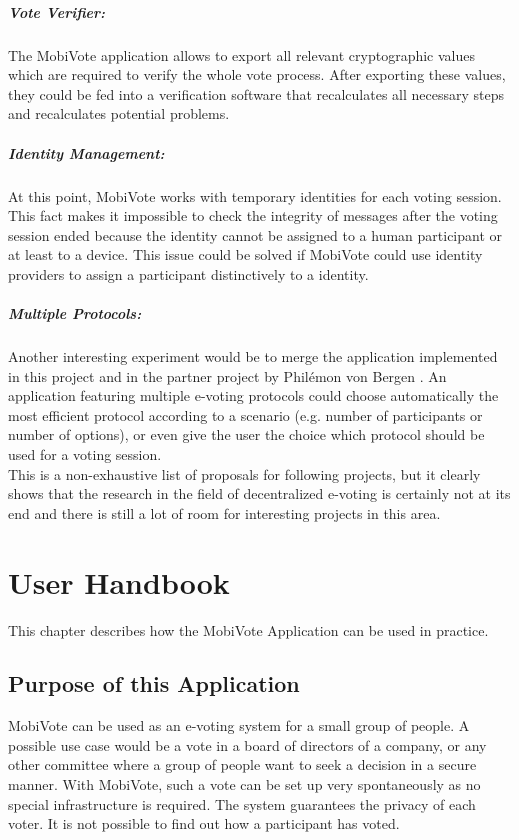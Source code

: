 \documentclass[numbers=noenddot, abstract=on, a4paper, headsepline,
footsepline, oneside, draft=off]{scrreprt}
\begin{document}
\paragraph{Vote Verifier:} The MobiVote application allows to export all
relevant cryptographic values which are required to verify the whole vote
process. After exporting these values, they could be fed into a verification
software that recalculates all necessary steps and recalculates potential
problems.

\paragraph{Identity Management:} At this point, MobiVote works with temporary
identities for each voting session. This fact makes it impossible to check the
integrity of messages after the voting session ended because the identity cannot
be assigned to a human participant or at least to a device. This issue could be
solved if MobiVote could use identity providers to assign a participant
distinctively to a identity.

\paragraph{Multiple Protocols:} Another interesting experiment would be to merge
the application implemented in this project and in the partner project by
Philémon von Bergen \cite{vonBergen14}. An application featuring multiple
e-voting protocols could choose automatically the most efficient protocol
according to a scenario (e.g. number of participants or number of options), or
even give the user the choice which protocol should be used for a voting
session.
\\

This is a non-exhaustive list of proposals for following projects, but it
clearly shows that the research in the field of decentralized e-voting is
certainly not at its end and there is still a lot of room for interesting
projects in this area.

\printbibliography

\appendix

\chapter{User Handbook}
\label{cha:handbook}
This chapter describes how the MobiVote Application can be used in practice.

\section{Purpose of this Application}
MobiVote can be used as an e-voting system for a small group of people. A
possible use case would be a vote in a board of directors of a company, or any
other committee where a group of people want to seek a decision in a secure
manner. With MobiVote, such a vote can be set up very spontaneously as no
special infrastructure is required. The system guarantees the privacy of each
voter. It is not possible to find out how a participant has voted.
\end{document}
